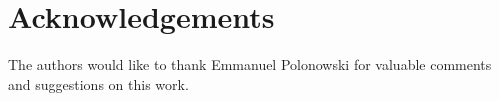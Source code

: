 \section*{Acknowledgements}
The authors would like to thank Emmanuel Polonowski for valuable comments and 
suggestions on this work.

